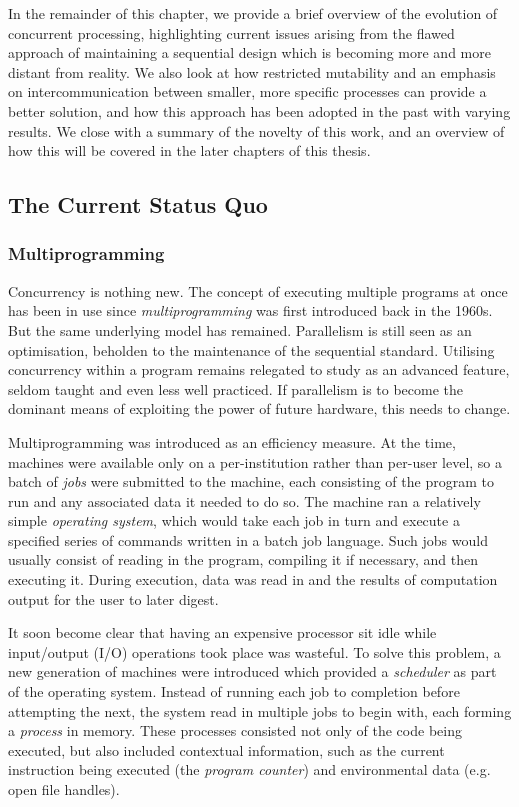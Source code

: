 In the remainder of this chapter, we provide a brief overview of the
evolution of concurrent processing, highlighting current issues
arising from the flawed approach of maintaining a sequential design
which is becoming more and more distant from reality.  We also look at
how restricted mutability and an emphasis on intercommunication
between smaller, more specific processes can provide a better
solution, and how this approach has been adopted in the past with
varying results.  We close with a summary of the novelty of this work,
and an overview of how this will be covered in the later chapters of
this thesis.

\subsection{The Current Status Quo}

\subsubsection{Multiprogramming}

Concurrency is nothing new.  The concept of executing multiple
programs at once has been in use since \emph{multiprogramming} was
first introduced back in the 1960s.  But the same underlying model has
remained.  Parallelism is still seen as an optimisation, beholden to
the maintenance of the sequential standard.  Utilising concurrency
within a program remains relegated to study as an advanced feature,
seldom taught and even less well practiced.  If parallelism is to
become the dominant means of exploiting the power of future hardware,
this needs to change.

Multiprogramming was introduced as an efficiency measure.  At the
time, machines were available only on a per-institution rather than
per-user level, so a batch of \emph{jobs} were submitted to the
machine, each consisting of the program to run and any associated data
it needed to do so.  The machine ran a relatively simple
\emph{operating system}, which would take each job in turn and execute
a specified series of commands written in a batch job language.  Such
jobs would usually consist of reading in the program, compiling it if
necessary, and then executing it.  During execution, data was read in
and the results of computation output for the user to later digest.

It soon become clear that having an expensive processor sit idle while
input/output (I/O) operations took place was wasteful.  To solve this
problem, a new generation of machines were introduced which provided a
\emph{scheduler} as part of the operating system.  Instead of running
each job to completion before attempting the next, the system read in
multiple jobs to begin with, each forming a \emph{process} in memory.
These processes consisted not only of the code being executed, but
also included contextual information, such as the current instruction
being executed (the \emph{program counter}) and environmental data
(e.g. open file handles).

